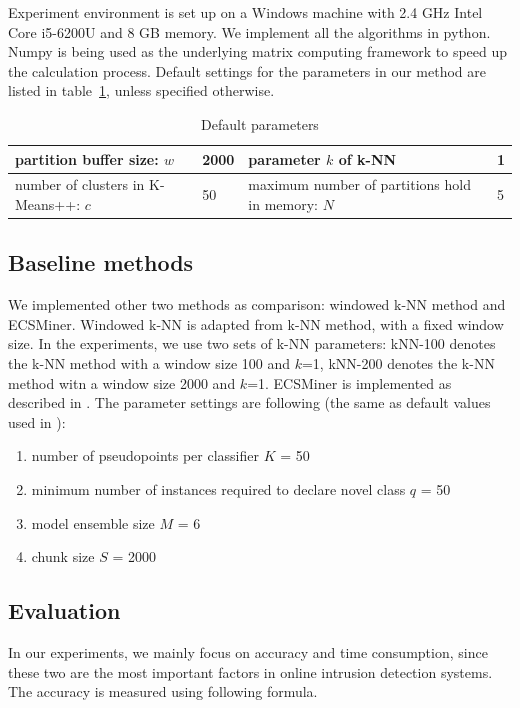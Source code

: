 \documentclass[runningheads]{llncs}
\begin{document}
	Experiment environment is set up on a Windows machine with 2.4 GHz Intel Core i5-6200U and 8 GB memory. We implement all the algorithms in python. Numpy is being used as the underlying matrix computing framework to speed up the calculation process. Default settings for the parameters in our method are listed in table~\ref{table:parameters}, unless specified otherwise.
	
	\begin{table}
		\centering
		\caption{Default parameters}\label{table:parameters}
		\begin{tabular}{|m{14em}|m{4em}|m{14em}|m{4em}|}
			\hline
			partition buffer size: $w$ & 2000 & parameter $k$ of k-NN & 1 \\
			\hline
			number of clusters in K-Means++: $c$ & 50 & maximum number of partitions hold in memory: $N$ & 5 \\ 
			\hline
		\end{tabular}
	\end{table} 
	\subsection{Baseline methods}
	
	We implemented other two methods as comparison: windowed k-NN method and ECSMiner. Windowed k-NN is adapted from k-NN method, with a fixed window size. In the experiments, we use two sets of k-NN parameters: kNN-100 denotes the k-NN method with a window size 100 and $k$=1, kNN-200 denotes the k-NN method witn a window size 2000 and $k$=1. ECSMiner is implemented as described in \cite{Masud2011}. The parameter settings are following (the same as default values used in \cite{Masud2011}):
	\begin{enumerate}
		\item number of pseudopoints per classifier $K$ = 50
		\item minimum number of instances required to declare novel class $q$ = 50
		\item model ensemble size $M$ = 6
		\item chunk size $S$ = 2000
	\end{enumerate}
	
	
	\subsection{Evaluation}
	
	In our experiments, we mainly focus on accuracy and time consumption, since these two are the most important factors in online intrusion detection systems. The accuracy is measured using following formula.
	
\end{document}
